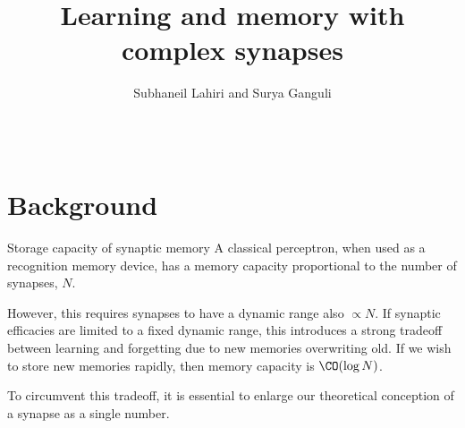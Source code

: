\documentclass[final,hyperref={pdfpagelabels=false,bookmarks=false}]{beamer}
\title{Learning and memory with complex synapses}
\author{Subhaneil Lahiri and Surya Ganguli}
\institute[Stanford]{%
Department of Applied Physics, Stanford University, Stanford CA
}
\begin{document}
\begin{frame}{}

\begin{columns}[t]


\begin{column}{0.27\linewidth}

\section{Background}


\begin{block}{Storage capacity of synaptic memory}
%
%
 A classical perceptron, when used as a recognition memory device, has a memory capacity proportional to the number of synapses, $N$.

 \vp However, this requires synapses to have a dynamic range also $\propto N$.
 If synaptic efficacies are limited to a fixed dynamic range, this introduces a strong tradeoff between learning and forgetting due to new memories overwriting old.
 If we wish to store new memories rapidly, then memory capacity is $\CO(\log N)$.
 \\ 

 \vp To circumvent this tradeoff, it is essential to enlarge our theoretical conception of a synapse as a single number.
\end{block}



\end{column}
\end{columns}
\end{frame}
\end{document}
